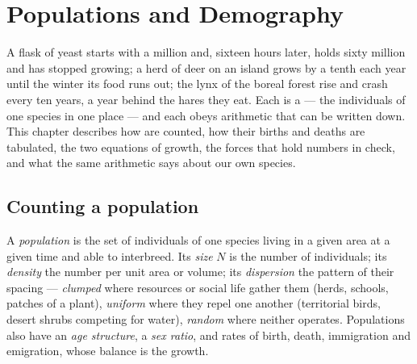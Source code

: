 \chapter{Populations and Demography}\label{ch:b1:populations}

A flask of yeast starts with a million  and, sixteen hours later,
holds sixty million and has stopped growing; a herd of deer on an
island grows by a tenth each year until the winter its food runs out;
the lynx of the boreal forest rise and crash every ten years, a year
behind the hares they eat. Each is a \emph{} --- the
individuals of one species in one place --- and each obeys arithmetic
that can be written down. This chapter describes how  are
counted, how their births and deaths are tabulated, the two equations
of growth, the forces that hold numbers in check, and what the same
arithmetic says about our own species.

\section{Counting a population}

\begin{definition}\label{def:b1:populations:population}
A \emph{population} is the set of individuals of one species living
in a given area at a given time and able to interbreed. Its
\emph{size} $N$ is the number of individuals; its \emph{density} the
number per unit area or volume; its \emph{dispersion} the pattern of
their spacing --- \emph{clumped} where resources or social life gather
them (herds, schools, patches of a plant), \emph{uniform} where they
repel one another (territorial birds, desert shrubs competing for
water), \emph{random} where neither operates. Populations also have an
\emph{age structure}, a \emph{sex ratio}, and rates of birth, death,
immigration and emigration, whose balance is the growth.
\end{definition}

